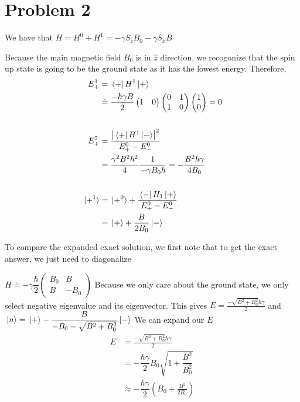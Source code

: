 \documentclass[10pt]{article}
\begin{document}
\section*{Problem 2}
We have that $H = H^0 + H^1 = -\gamma S_z B_0 - \gamma S_x B$

Because the main magnetic field $B_0$ is in $\hat{z}$ direction, we recogonize that the spin up state is going to be the ground state as it has the lowest energy. Therefore,
\begin{align*}
	E_+^1 & = \bra*{+} H^1 \ket*{+}                                                               \\
	      & \doteq \dfrac{-\hbar \gamma B}{2} \begin{pmatrix}
		1 & 0
	\end{pmatrix} \begin{pmatrix}
		0 & 1 \\ 1 & 0
	\end{pmatrix}
	\begin{pmatrix}
		1 \\ 0
	\end{pmatrix} =0
\\
\\
E_+^2 &= \frac{\abs{\bra*{+} H^1 \ket*{-}}^2}{E_+^0 - E_-^0} \\
      &= \dfrac{\gamma ^2 B^2 \hbar ^2}{4}  \dfrac{1}{- \gamma B_0 \hbar} = - \dfrac{B^2 \hbar \gamma}{4 B_0} \\
\\
\ket*{+^1} &= \ket*{+^0}+ \dfrac{\bra*{-} H_1\ket*{+}}{E_+^0 - E_-^0}\\
& = \ket*{+} + \dfrac{B}{2B_0}\ket*{-}
\end{align*}

To compare the expanded exact solution, we first note that to get the exact answer, we just need to diagonalize 

$H \doteq -\gamma \dfrac{\hbar}{2}\begin{pmatrix}
    B_0 & B \\ B & - B_0
\end{pmatrix}$
Because we only care about the ground state, we only select negative eigenvalue and its eigenvector. This gives
$E = \frac{-\sqrt{B^2 + B_0 ^2}\hbar \gamma}{2}$ and $\ket*{n} = \ket*{+} - \dfrac{B}{-B_0 - \sqrt{B^2 + B_0^2}} \ket*{-}$
We can expand our $E$
\begin{align*}
    E &= \frac{-\sqrt{B^2 + B_0 ^2}\hbar \gamma}{2} \\
    &= -\dfrac{\hbar \gamma}{2} B_0 \sqrt{1 + \dfrac{B^2}{B_0^2}}\\
    &\approx -\dfrac{\hbar \gamma}{2} (B_0+ \frac{B^2}{2B_0} )
\end{align*}
\end{document}
